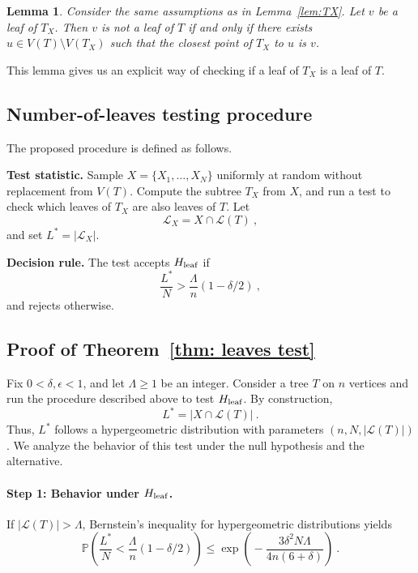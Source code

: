 \documentclass[12pt]{article}
\newtheorem{lemma}[theorem]{Lemma}
\begin{document}
\begin{lemma}\label{lem:TX2}
    Consider the same assumptions as in Lemma~\ref{lem:TX}. 
Let $v$ be a leaf of $T_X$. Then $v$ is not a leaf of $T$ if and only if there exists
$u\in V(T)\setminus V(T_X)$ such that the closest point of $T_X$ to $u$ is $v$.
\end{lemma}

This lemma gives us an explicit way of checking if a leaf of $T_X$ is a leaf of $T$.

\subsection{Number-of-leaves testing procedure}

The proposed procedure is defined as follows. 

\medskip
\noindent\textbf{Test statistic.} Sample $X=\{X_1,\dots,X_N\}$ uniformly at random without replacement from $V(T)$.
Compute the subtree $T_X$ from $X$, and run a test to check which leaves of $T_X$ are also leaves of $T$. Let
\[
\mathcal{L}_X = X \cap \mathcal{L}(T)~,
\]
and set $L^* = |\mathcal{L}_X|$.

\medskip
\noindent\textbf{Decision rule.}  The test accepts $H_{\rm leaf}$ if
\[
\frac{L^*}{N} > \frac{\Lambda}{n}(1-\delta/2)~,
\]
and rejects otherwise.


\subsection{Proof of Theorem~\ref{thm: leaves test}}

    Fix $0<\delta,\epsilon<1$, and let $\Lambda\ge 1$ be an integer. 
    Consider a tree $T$ on $n$ vertices and run the procedure described above to test $H_{\rm leaf}$.     By construction,
    \[
        L^* = |X \cap \mathcal{L}(T)|~.
    \]
    Thus, $L^*$ follows a hypergeometric distribution with parameters $(n,N,|\mathcal{L}(T)|)$.
    We analyze the behavior of this test under the null hypothesis and the alternative.
    
\paragraph{Step 1: Behavior under $H_{\rm leaf}$.} 
    If $|\mathcal{L}(T)| > \Lambda$, Bernstein's inequality for hypergeometric distributions yields
    \begin{equation}\label{eq: leaf inequality 1}
        \mathbb{P}\!\left(\frac{L^*}{N} < \frac{\Lambda}{n}(1-\delta/2)\right)
        \le \exp\!\left(\!-\frac{3\delta^2 N \Lambda}{4n(6+\delta)}\right)~.
    \end{equation}
\end{document}
